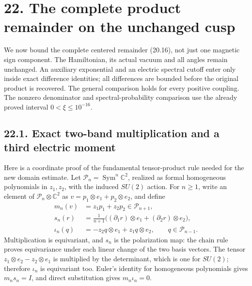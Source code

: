 \documentclass[
]{article}
\begin{document}
\section{22. The complete product remainder on the unchanged
cusp}\label{the-complete-product-remainder-on-the-unchanged-cusp}

We now bound the complete centered remainder (20.16), not just one
magnetic sign component. The Hamiltonian, its actual vacuum and all
angles remain unchanged. An auxiliary exponential and an electric
spectral cutoff enter only inside exact difference identities; all
differences are bounded before the original product is recovered. The
general comparison holds for every positive coupling. The nonzero
denominator and spectral-probability comparison use the already proved
interval \(0<\xi\le10^{-16}\).

\subsection{22.1. Exact two-band multiplication and a third electric
moment}\label{exact-two-band-multiplication-and-a-third-electric-moment}

Here is a coordinate proof of the fundamental tensor-product rule needed
for the new domain estimate. Let
\(\mathcal P_n=\operatorname{Sym}^n\mathbb C^2\), realized as formal
homogeneous polynomials in \(z_1,z_2\), with the induced \(SU(2)\)
action. For \(n\ge1\), write an element of
\(\mathcal P_n\otimes\mathbb C^2\) as
\(v=p_1\otimes e_1+p_2\otimes e_2\), and define \[
\begin{aligned}
m_n(v)&=z_1p_1+z_2p_2\in\mathcal P_{n+1},\\
s_n(r)&=\frac1{n+1}
  \bigl((\partial_1r)\otimes e_1+(\partial_2r)\otimes e_2\bigr),\\
\iota_n(q)&=-z_2q\otimes e_1+z_1q\otimes e_2,\qquad q\in\mathcal P_{n-1}.
\end{aligned}                                                   \tag{22.1}
\] Multiplication is equivariant, and \(s_n\) is the polarization map:
the chain rule proves equivariance under each linear change of the two
basis vectors. The tensor \(z_1\otimes e_2-z_2\otimes e_1\) is
multiplied by the determinant, which is one for \(SU(2)\); therefore
\(\iota_n\) is equivariant too. Euler's identity for homogeneous
polynomials gives \(m_ns_n=I\), and direct substitution gives
\(m_n\iota_n=0\).
\end{document}
